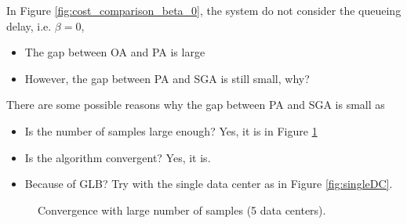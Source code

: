 In Figure \ref{fig:cost_comparison_beta_0}, the system do not consider the queueing delay, i.e. $\beta=0$,
\begin{itemize}
	\item The gap between OA and PA is large
	\item However, the gap between PA and SGA is still small, why? 
\end{itemize}

There are some possible reasons why the gap between PA and SGA is small as

\begin{itemize}
	\item Is the number of samples large enough? Yes, it is in Figure \ref{fig:converge_debug}
	\item Is the algorithm convergent? Yes, it is.
	\item Because of GLB? Try with the single data center as in Figure \ref{fig:singleDC}.
\end{itemize}

\begin{figure}[!h]	
	\centering
	\caption{Convergence with large number of samples (5 data centers).}
	\label{fig:converge_debug}
\end{figure}

